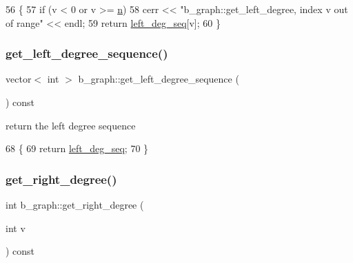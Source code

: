\begin{DoxyCode}
56 \{
57   \textcolor{keywordflow}{if} (v < 0 or v >= \hyperlink{classb__graph_a9e211d40c1799bc9b125de472ff06642}{n})
58     cerr << \textcolor{stringliteral}{"b\_graph::get\_left\_degree, index v out of range"} << endl;
59   \textcolor{keywordflow}{return} \hyperlink{classb__graph_a311d16462dbb10c47b3a6c80a42139d9}{left\_deg\_seq}[v];
60 \}
\end{DoxyCode}
\mbox{\label{classb__graph_afd65fb655f7e24217393a10533b87d3c}} 
\subsubsection{\texorpdfstring{get\+\_\+left\+\_\+degree\+\_\+sequence()}{get\_left\_degree\_sequence()}}
{\footnotesize\ttfamily vector$<$ int $>$ b\+\_\+graph\+::get\+\_\+left\+\_\+degree\+\_\+sequence (\begin{DoxyParamCaption}{ }\end{DoxyParamCaption}) const}



return the left degree sequence 


\begin{DoxyCode}
68 \{
69   \textcolor{keywordflow}{return} \hyperlink{classb__graph_a311d16462dbb10c47b3a6c80a42139d9}{left\_deg\_seq};
70 \}
\end{DoxyCode}
\mbox{\label{classb__graph_a1caf2e1ca8ee19e7407f489be6b171b8}} 
\subsubsection{\texorpdfstring{get\+\_\+right\+\_\+degree()}{get\_right\_degree()}}
{\footnotesize\ttfamily int b\+\_\+graph\+::get\+\_\+right\+\_\+degree (\begin{DoxyParamCaption}\item[{int}]{v }\end{DoxyParamCaption}) const}



